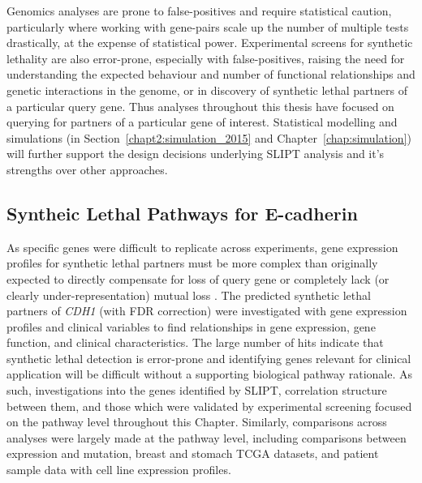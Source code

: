 Genomics analyses are prone to false-positives and require statistical caution, particularly where working with gene-pairs scale up the number of multiple tests drastically, at the expense of statistical power.  Experimental screens for synthetic lethality are also error-prone, especially with false-positives, raising the need for understanding the expected behaviour and number of functional relationships and genetic interactions in the genome, or in discovery of synthetic lethal partners of a particular query gene. Thus analyses throughout this thesis have focused on querying for partners of a particular gene of interest. Statistical modelling and simulations (in Section~\ref{chapt2:simulation_2015} and Chapter~\ref{chap:simulation}) will further support the design decisions underlying \gls{SLIPT} analysis and it's strengths over other approaches.

\subsection{Syntheic Lethal Pathways for E-cadherin}

As specific genes were difficult to replicate across experiments, gene expression profiles for synthetic lethal partners must be more complex than originally expected to directly compensate for loss of query gene or completely lack (or clearly under-represent\-ation) mutual loss \citep{Kelly2013, Jerby2014, Lu2015}. The predicted synthetic lethal partners of \textit{CDH1} (with FDR correction) were investigated with gene expression profiles and clinical variables to find relationships in gene expression, gene function, and clinical characteristics. The large number of hits indicate that synthetic lethal detection is error-prone and identifying genes relevant for clinical application will be difficult without a supporting biological pathway rationale. As such, investigations into the genes identified by \gls{SLIPT}, correlation structure between them, and those which were validated by experimental screening \citep{Telford2015} focused on the pathway level throughout this Chapter. Similarly, comparisons across analyses were largely made at the pathway level, including comparisons between expression and mutation, breast and stomach TCGA datasets, and patient sample data with cell line expression profiles.

